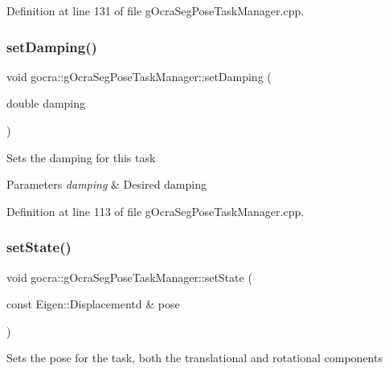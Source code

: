Definition at line 131 of file g\+Ocra\+Seg\+Pose\+Task\+Manager.\+cpp.

\hypertarget{classgocra_1_1gOcraSegPoseTaskManager_af1c9cd4b30f956ef607c19a7756c71f9}{}\label{classgocra_1_1gOcraSegPoseTaskManager_af1c9cd4b30f956ef607c19a7756c71f9} 
\subsubsection{\texorpdfstring{set\+Damping()}{setDamping()}}
{\footnotesize\ttfamily void gocra\+::g\+Ocra\+Seg\+Pose\+Task\+Manager\+::set\+Damping (\begin{DoxyParamCaption}\item[{double}]{damping }\end{DoxyParamCaption})}

Sets the damping for this task


\begin{DoxyParams}{Parameters}
{\em damping} & Desired damping \\
\hline
\end{DoxyParams}


Definition at line 113 of file g\+Ocra\+Seg\+Pose\+Task\+Manager.\+cpp.

\hypertarget{classgocra_1_1gOcraSegPoseTaskManager_a555cdc369d151ba153bcd681461cde24}{}\label{classgocra_1_1gOcraSegPoseTaskManager_a555cdc369d151ba153bcd681461cde24} 
\subsubsection{\texorpdfstring{set\+State()}{setState()}\hspace{0.1cm}{\footnotesize\ttfamily [1/2]}}
{\footnotesize\ttfamily void gocra\+::g\+Ocra\+Seg\+Pose\+Task\+Manager\+::set\+State (\begin{DoxyParamCaption}\item[{const Eigen\+::\+Displacementd \&}]{pose }\end{DoxyParamCaption})}

Sets the pose for the task, both the translational and rotational components


